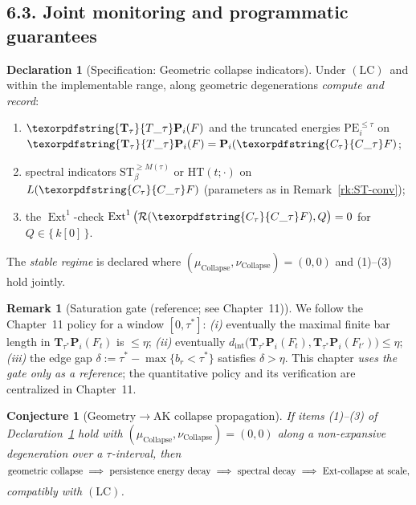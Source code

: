 \documentclass[11pt]{article}
\DeclareMathOperator{\Ext}{Ext}
\DeclareRobustCommand{\hyp}{\nobreakdash-}
\newcommand{\Rfun}{\mathcal{R}}
\numberwithin{equation}{section}
\newtheorem{conjecture}{Conjecture}[section]
\theoremstyle{definition}
\newtheorem{remark}[theorem]{Remark}
\newtheorem{declaration}[theorem]{Declaration}
\DeclareRobustCommand{\Ttau}{\texorpdfstring{\ensuremath{\mathbf{T}_{\tau}}}{T\_\tau}}
\DeclareRobustCommand{\Ctau}{\texorpdfstring{\ensuremath{C_{\tau}}}{C\_\tau}}
\DeclareRobustCommand{\muc}{\mu_{\mathrm{Collapse}}}
\DeclareRobustCommand{\nuc}{\nu_{\mathrm{Collapse}}}
\DeclareRobustCommand{\LC}{\texorpdfstring{\ensuremath{\mathrm{(LC)}}}{(LC)}}
\DeclareRobustCommand{\Qtest}{\{\,k[0]\,\}}
\begin{document}
\subsection*{6.3. Joint monitoring and programmatic guarantees}
\begin{declaration}[Specification: Geometric collapse indicators]\label{spec:geom-indicators}
Under \LC\ and within the implementable range, along geometric degenerations \emph{compute and record}:
\begin{enumerate}
  \item \(\Ttau\mathbf{P}_i(F)\) and the truncated energies \(\mathrm{PE}_i^{\le\tau}\) on \(\Ttau\mathbf{P}_i(F)=\mathbf{P}_i(\Ctau F)\);
  \item spectral indicators \(\mathrm{ST}_{\beta}^{\ge M(\tau)}\) or \(\mathrm{HT}(t;\cdot)\) on \(L(\Ctau F)\) (parameters as in Remark~\ref{rk:ST-conv});
  \item the \(\Ext^1\)\hyp check \(\Ext^1\big(\Rfun(\Ctau F),Q\big)=0\) for \(Q\in\Qtest\).
\end{enumerate}
The \emph{stable regime} is declared where \((\muc,\nuc)=(0,0)\) and (1)–(3) hold jointly.
\end{declaration}

\begin{remark}[Saturation gate (reference; see Chapter~11)]\label{rk:sat-gate-ch6}
We follow the Chapter~11 policy for a window \([0,\tau^\ast]\): \emph{(i)} eventually the maximal finite bar length in \(\mathbf{T}_{\tau^\ast}\mathbf{P}_i(F_t)\) is \(\le \eta\); \emph{(ii)} eventually \(d_{\mathrm{int}}\!\big(\mathbf{T}_{\tau^\ast}\mathbf{P}_i(F_t),\mathbf{T}_{\tau^\ast}\mathbf{P}_i(F_{t'})\big)\le \eta\); \emph{(iii)} the edge gap \(\delta:=\tau^\ast-\max\{b_r<\tau^\ast\}\) satisfies \(\delta>\eta\).
This chapter \emph{uses the gate only as a reference}; the quantitative policy and its verification are centralized in Chapter~11.
\end{remark}

\begin{conjecture}[Geometry\texorpdfstring{$\to$}{->}AK collapse propagation]\label{conj:geom-prop}
If items \emph{(1)}–\emph{(3)} of Declaration~\ref{spec:geom-indicators} hold with \((\muc,\nuc)=(0,0)\) along a non\hyp expansive degeneration over a \(\tau\)\hyp interval, then
\[
  \text{geometric collapse}\ \Longrightarrow\ \text{persistence\ energy\ decay}\ \Longrightarrow\ \text{spectral decay}\ \Longrightarrow\ \text{\(\Ext\)\hyp collapse at scale},
\]
compatibly with \LC.
\end{conjecture}
\end{document}
